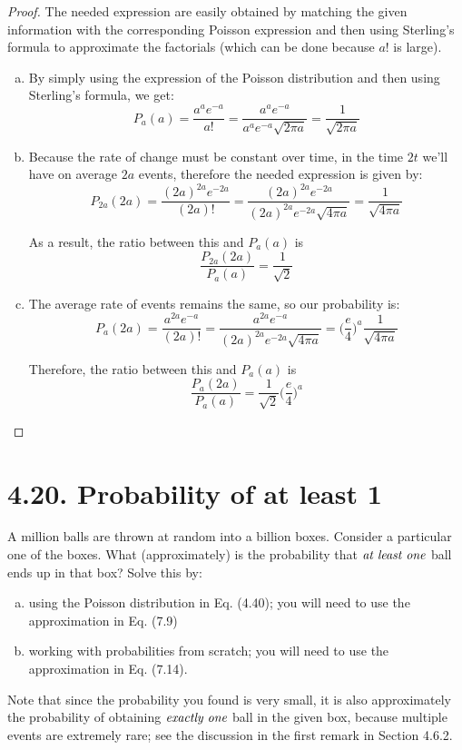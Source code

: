 \begin{proof}
    The needed expression are easily obtained by matching the given information with
    the corresponding Poisson expression and then using Sterling's formula to approximate
    the factorials (which can be done because $a!$ is large).

    \begin{enumerate}[(a)]
        \item By simply using the expression of the Poisson distribution and
            then using Sterling's formula, we get:
            \[
                P_a(a) = \frac{a^a e^{-a}}{a!} = \frac{a^a e^{-a}}{a^a e^{-a} \sqrt{2 \pi a}} 
                = \frac{1}{\sqrt{2 \pi a}}
            \] 

        \item Because the rate of change must be constant over time, in the time $2t$ 
            we'll have on average $2a$ events, therefore the needed expression is
            given by:
            \[
                P_{2a}(2a) = \frac{(2a)^{2a} e^{-2a}}{(2a)!} 
                = \frac{(2a)^{2a} e^{-2a}}{(2a)^{2a} e^{-2a} \sqrt{4\pi a}} 
                = \frac{1}{\sqrt{4\pi a}}
            \] 

            As a result, the ratio between this and $P_a(a)$ is
             \[
                 \frac{P_{2a}(2a)}{P_a(a)} = \frac{1}{\sqrt{2}}
            \] 

        \item The average rate of events remains the same, so our probability is:
            \[
                P_a(2a) = \frac{a^{2a} e^{-a}}{(2a)!}
                = \frac{a^{2a} e^{-a}}{(2a)^{2a} e^{-2a} \sqrt{4\pi a}} 
                = \bigg(\frac{e}{4}\bigg)^{a} \frac{1}{\sqrt{4\pi a}}
            \] 

            Therefore, the ratio between this and $P_a(a)$ is
            \[
                \frac{P_a(2a)}{P_a(a)} = \frac{1}{\sqrt{2}} \bigg(\frac{e}{4}\bigg)^a
            \] 
    \end{enumerate}
\end{proof}

\section*{4.20. Probability of at least 1}
A million balls are thrown at random into a billion boxes.
Consider a particular one of the boxes. What (approximately)
is the probability that $\emph{at least one}$ ball ends
up in that box? Solve this by:
\begin{enumerate}[(a)]
    \item using the Poisson distribution in Eq. (4.40); you will
        need to use the approximation in Eq. (7.9)

    \item working with probabilities from scratch; you will need
        to use the approximation in Eq. (7.14).
\end{enumerate}
Note that since the probability you found is very small, it is
also approximately the probability of obtaining $\emph{exactly one}$ 
ball in the given box, because multiple events are extremely rare;
see the discussion in the first remark in Section 4.6.2.

